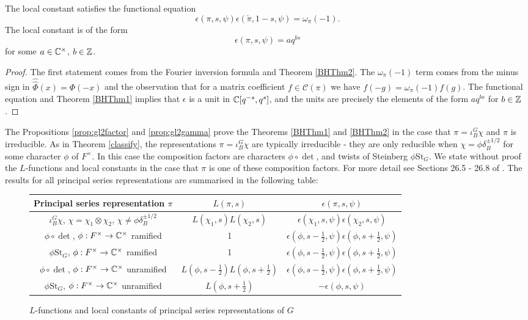\begin{cor}
    The local constant satisfies the functional equation
    $$\epsilon(\pi,s,\psi)\epsilon(\check{\pi},1-s,\psi) = \omega_\pi(-1).$$
    The local constant is of the form $$\epsilon(\pi,s,\psi) = aq^{bs}$$ for some $a \in \mathbb{C}^\times$, $b \in \mathbb{Z}$. 
\end{cor}
\begin{proof}
    The first statement comes from the Fourier inversion formula and Theorem \ref{BHThm2}. The $\omega_\pi(-1)$ term comes from the minus sign in $\hat{\hat{\Phi}}(x)=\Phi(-x)$ and the observation that for a matrix coefficient $f \in \mathcal C(\pi)$ we have $f(-g)=\omega_\pi(-1)f(g)$. The functional equation and Theorem \ref{BHThm1} implies that $\epsilon$ is a unit in $\mathbb{C}[q^{-s},q^s]$, and the units are precisely the elements of the form $aq^{bs}$ for $b \in \mathbb{Z}$.
\end{proof}

The Propositions \ref{prop:gl2factor} and \ref{prop:gl2gamma} prove the Theorems \ref{BHThm1} and \ref{BHThm2} in the case that $\pi = \iota_B^G \chi$ and $\pi$ is irreducible. As in Theorem \ref{classify}, the representations $\pi = \iota_B^G \chi$ are typically irreducible - they are only reducible when $\chi = \phi \delta_B^{\pm 1/2}$ for some character $\phi$ of $F^\times$. In this case the composition factors are characters $\phi \circ \det$, and twists of Steinberg $\phi \mathrm{St}_G$. We state without proof the $L$-functions and local constants in the case that $\pi$ is one of these composition factors. For more detail see Sections 26.5 - 26.8 of \cite{BH1}. The results for all principal series representations are summarised in the following table:

\begin{figure}[h!]
    \centering
    \begin{tabular}{ |c|c|c| }
        \hline
        Principal series representation $\pi$ & $L(\pi,s)$ & $\epsilon(\pi,s,\psi)$ \\ \hline
        $\iota_B^G \chi$, $\chi=\chi_1\otimes \chi_2$, $\chi \neq \phi \delta_B^{\pm 1/2}$ & $L(\chi_1,s)L(\chi_2,s)$ & $\epsilon(\chi_1,s,\psi)\epsilon(\chi_2,s,\psi)$ \\ 
        $\phi \circ \det$, $\phi :F^\times \to \mathbb{C}^\times$ ramified & 1 & $\epsilon(\phi,s-\frac{1}{2},\psi)\epsilon(\phi,s+\frac{1}{2},\psi)$ \\ 
        $\phi \mathrm{St}_G$, $\phi :F^\times \to \mathbb{C}^\times$ ramified & 1 & $\epsilon(\phi,s-\frac{1}{2},\psi)\epsilon(\phi,s+\frac{1}{2},\psi)$ \\  
        $\phi \circ \det$, $\phi :F^\times \to \mathbb{C}^\times$ unramified & $L(\phi,s-\frac{1}{2})L(\phi,s+\frac{1}{2})$ & $\epsilon(\phi,s-\frac{1}{2},\psi)\epsilon(\phi,s+\frac{1}{2},\psi)$ \\ 
        $\phi \mathrm{St}_G$, $\phi :F^\times \to \mathbb{C}^\times$ unramified & $L(\phi,s+\frac{1}{2})$ & $-\epsilon(\phi,s,\psi)$ \\     
        \hline
       \end{tabular}
       \caption{$L$-functions and local constants of principal series representations of $G$}
\end{figure}

